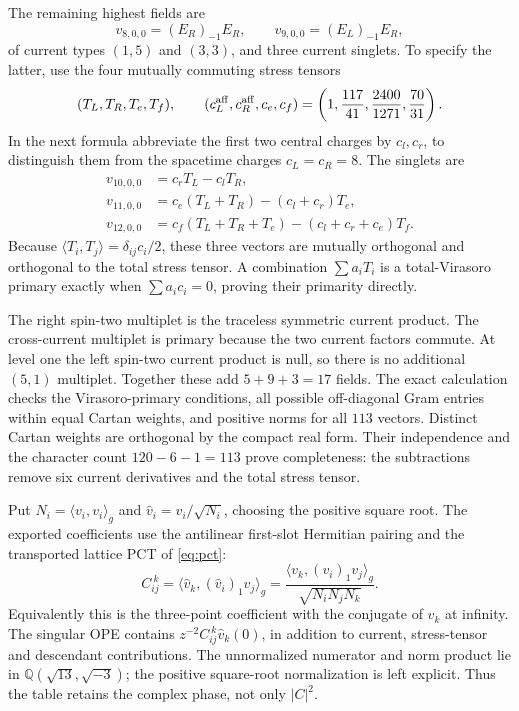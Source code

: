 \documentclass[11pt,a4paper]{article}
\theoremstyle{definition}
\begin{document}
The remaining highest fields are
\[
 v_{8,0,0}=(E_R)_{-1}E_R,\qquad
 v_{9,0,0}=(E_L)_{-1}E_R,
\]
of current types $(1,5)$ and $(3,3)$, and three current singlets.
To specify the latter, use the four mutually commuting stress tensors
\[
 (T_L,T_R,T_e,T_f),\qquad
 (c_L^{\rm aff},c_R^{\rm aff},c_e,c_f)
 =\left(1,\frac{117}{41},\frac{2400}{1271},\frac{70}{31}\right).
\]
In the next formula abbreviate the first two central charges by
$c_l,c_r$, to distinguish them from the spacetime charges $c_L=c_R=8$.
The singlets are
\begin{align}
 v_{10,0,0}&=c_rT_L-c_lT_R,\\
 v_{11,0,0}&=c_e(T_L+T_R)-(c_l+c_r)T_e,\\
 v_{12,0,0}&=c_f(T_L+T_R+T_e)-(c_l+c_r+c_e)T_f.
 \label{eq:physics-stress-primaries}
\end{align}
Because $\langle T_i,T_j\rangle=\delta_{ij}c_i/2$, these three
vectors are mutually orthogonal and orthogonal to the total stress
tensor. A combination $\sum a_iT_i$ is a total-Virasoro primary
exactly when $\sum a_ic_i=0$, proving their primarity directly.

The right spin-two multiplet is the traceless symmetric current
product. The cross-current multiplet is primary because the two
current factors commute. At level one the left spin-two current
product is null, so there is no additional $(5,1)$ multiplet.
Together these add $5+9+3=17$ fields. The exact calculation checks
the Virasoro-primary conditions, all possible off-diagonal Gram
entries within equal Cartan weights, and positive norms for all
$113$ vectors. Distinct Cartan weights are orthogonal by the compact
real form. Their independence and the character count
$120-6-1=113$ prove completeness: the subtractions remove six current
derivatives and the total stress tensor.

Put $N_i=\langle v_i,v_i\rangle_g$ and
$\widehat v_i=v_i/\sqrt{N_i}$, choosing the positive square root.
The exported coefficients use the antilinear first-slot Hermitian
pairing and the transported lattice PCT of \eqref{eq:pct}:
\begin{equation}\label{eq:physics-primary-three-point}
 C_{ij}^{\ k}
 =\langle\widehat v_k,(\widehat v_i)_1\widehat v_j\rangle_g
 =\frac{\langle v_k,(v_i)_1v_j\rangle_g}
 {\sqrt{N_iN_jN_k}}.
\end{equation}
Equivalently this is the three-point coefficient with the conjugate
of $\widehat v_k$ at infinity. The singular OPE contains
$z^{-2}C_{ij}^{\ k}\widehat v_k(0)$, in addition to current,
stress-tensor and descendant contributions. The unnormalized
numerator and norm product lie in
$\mathbb Q(\sqrt{13},\sqrt{-3})$; the positive square-root
normalization is left explicit. Thus the table retains the complex
phase, not only $|C|^2$.
\end{document}
